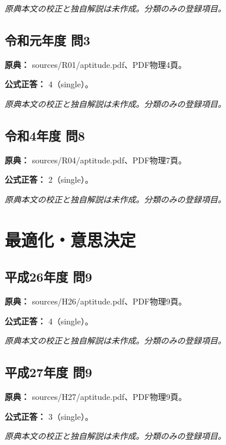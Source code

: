 \par\textit{原典本文の校正と独自解説は未作成。分類のみの登録項目。}

\subsection{令和元年度 問3}
\label{q:r01-reg-apt-03}

\noindent\textbf{原典：} sources/R01/aptitude.pdf、PDF物理4頁。

\textbf{公式正答：} 4（single）。

\par\textit{原典本文の校正と独自解説は未作成。分類のみの登録項目。}

\subsection{令和4年度 問8}
\label{q:r04-reg-apt-08}

\noindent\textbf{原典：} sources/R04/aptitude.pdf、PDF物理7頁。

\textbf{公式正答：} 2（single）。

\par\textit{原典本文の校正と独自解説は未作成。分類のみの登録項目。}

\section{最適化・意思決定}

\subsection{平成26年度 問9}
\label{q:h26-reg-apt-09}

\noindent\textbf{原典：} sources/H26/aptitude.pdf、PDF物理9頁。

\textbf{公式正答：} 4（single）。

\par\textit{原典本文の校正と独自解説は未作成。分類のみの登録項目。}

\subsection{平成27年度 問9}
\label{q:h27-reg-apt-09}

\noindent\textbf{原典：} sources/H27/aptitude.pdf、PDF物理9頁。

\textbf{公式正答：} 3（single）。

\par\textit{原典本文の校正と独自解説は未作成。分類のみの登録項目。}

